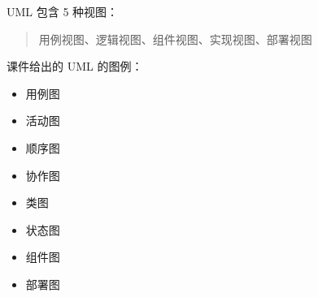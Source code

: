 \documentclass[UTF8]{ctexart}
\newenvironment{trivial}[0]{ %
    \begin{quote}\color{gray}\small
}{
    \end{quote}
}
\begin{document}
UML 包含 5 种视图：
\begin{trivial}
    用例视图、逻辑视图、组件视图、实现视图、部署视图
\end{trivial}

课件给出的 UML 的图例：
\begin{itemize}
    \item 用例图
    \item 活动图
    \item 顺序图
    \item 协作图
    \item 类图
    \item 状态图
    \item 组件图
    \item 部署图
\end{itemize}

\newpage
{}
\BgThispage
\printindex
\end{document}
